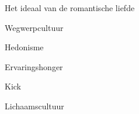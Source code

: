 \documentclass[main.tex]{subfiles}
\begin{document}
\begin{examenvraag}
    \begin{vraag}
        Het ideaal van de romantische liefde
    \end{vraag}

    \begin{antwoord}

    \end{antwoord}
\end{examenvraag}


\begin{examenvraag}
    \begin{vraag}
        Wegwerpcultuur
    \end{vraag}

    \begin{antwoord}

    \end{antwoord}
\end{examenvraag}


\begin{examenvraag}
    \begin{vraag}
        Hedonisme
    \end{vraag}

    \begin{antwoord}

    \end{antwoord}
\end{examenvraag}


\begin{examenvraag}
    \begin{vraag}
        Ervaringshonger
    \end{vraag}

    \begin{antwoord}

    \end{antwoord}
\end{examenvraag}


\begin{examenvraag}
    \begin{vraag}
        Kick
    \end{vraag}

    \begin{antwoord}

    \end{antwoord}
\end{examenvraag}


\begin{examenvraag}
    \begin{vraag}
        Lichaamscultuur
    \end{vraag}

    \begin{antwoord}

    \end{antwoord}
\end{examenvraag}
\end{document}
